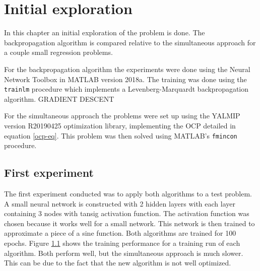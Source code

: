 \chapter{Initial exploration}
\label{cha:1}
In this chapter an initial exploration of the problem is done. The backpropagation algorithm is compared relative to the simultaneous approach for a couple small regression problems.

For the backpropagation algorithm the experiments were done using the Neural Network Toolbox in MATLAB version 2018a. The training was done using the \texttt{trainlm} procedure which implements a Levenberg-Marquardt backpropagation algorithm. GRADIENT DESCENT

For the simultaneous approach the problems were set up using the YALMIP version R20190425 optimization library, implementing the OCP detailed in equation \ref{ocp-eq}. This problem was then solved using MATLAB's \texttt{fmincon} procedure.



\section{First experiment}
The first experiment conducted was to apply both algorithms to a test problem. A small neural network is constructed with 2 hidden layers with each layer containing 3 nodes with tansig activation function. The activation function was chosen because it works well for a small network. This network is then trained to approximate a piece of a sine function. Both algorithms are trained for 100 epochs. Figure \ref{} shows the training performance for a training run of each algorithm. Both perform well, but the simultaneous approach is much slower. This can be due to the fact that the new algorithm is not well optimized.

